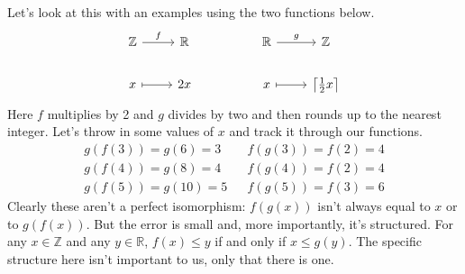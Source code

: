 \documentclass[12pt]{article}
\theoremstyle{definition}
\begin{document}
Let's look at this with an examples using the two functions below.
\[\begin{tikzcd}
        {\mathbb{Z}} & {\mathbb{R}} && {\mathbb{R}} & {\mathbb{Z}} \\
        x & 2x && x & {\big\lceil \frac{1}{2}x \big\rceil}
        \arrow["f", from=1-1, to=1-2]
        \arrow[maps to, from=2-1, to=2-2]
        \arrow["g", from=1-4, to=1-5]
        \arrow[maps to, from=2-4, to=2-5]
    \end{tikzcd}\]
Here $f$ multiplies by 2 and $g$ divides by two and then rounds up to the nearest integer.
Let's throw in some values of $x$ and track it through our functions.
\begin{align*}
    g(f(3))=g(6)=3  &  & f(g(3))=f(2)=4 \\
    g(f(4))=g(8)=4  &  & f(g(4))=f(2)=4 \\
    g(f(5))=g(10)=5 &  & f(g(5))=f(3)=6
\end{align*}
Clearly these aren't a perfect isomorphism: $f(g(x))$ isn't always equal to $x$ or to $g(f(x))$.
But the error is small and, more importantly, it's structured.
For any $x\in\mathbb{Z}$ and any $y\in\mathbb{R}$, $f(x) \le y$ if and only if $x \le g(y)$.
The specific structure here isn't important to us, only that there is one.
\end{document}
